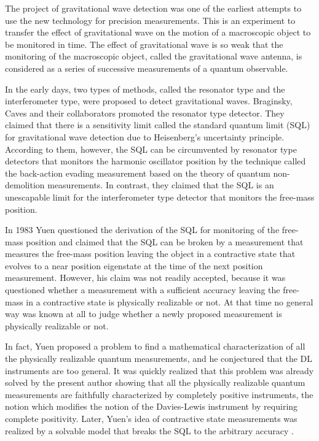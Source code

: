 \documentclass[12pt]{article}
\begin{document}
The project of gravitational wave detection was one of the earliest 
attempts to use the new technology for precision measurements.
This is an experiment to transfer the effect of gravitational wave 
on the motion of a macroscopic object to be monitored in time.
The effect of gravitational wave is so weak that the monitoring of
the macroscopic object, called the gravitational wave antenna, is
considered as a series of successive measurements of 
a quantum observable.

In the early days,  two types of methods, called the resonator type 
and the interferometer type, were proposed to detect gravitational waves.
Braginsky, Caves and their collaborators \cite{BVT80,CTDSZ80} promoted 
the resonator type detector.
They claimed that there is a sensitivity limit called the standard
quantum limit (SQL) for gravitational wave detection due to Heisenberg's
uncertainty principle.  According to them, however, the SQL can be circumvented 
by resonator type detectors that monitors the harmonic oscillator position
by the technique called the back-action evading measurement
based on the theory of quantum non-demolition measurements.
In contrast, they claimed that the SQL is an unescapable limit 
for the interferometer type detector that monitors the free-mass position.

In 1983 Yuen \cite{Yue83} questioned the derivation
of the SQL for monitoring of the free-mass position and claimed
that the SQL can be broken by a measurement 
that measures the free-mass position leaving the object in a
contractive state that evolves to a near position eigenstate 
at the time of the next position measurement.
However, his claim was not readily accepted, because it was questioned 
whether a measurement with a sufficient accuracy
leaving the free-mass in a contractive state is physically realizable or not.
At that time no general way was known at all to judge whether 
a newly proposed measurement is physically realizable or not.

In fact,  Yuen \cite{Yue87} proposed a problem to find a mathematical 
characterization of all the physically realizable quantum measurements,
and he conjectured that the DL instruments are too general.
It was quickly realized that this problem was already solved 
by the present author \cite{84QC} showing that all the physically realizable
quantum measurements are faithfully characterized by completely
positive instruments, the notion which modifies the notion of the
Davies-Lewis instrument by requiring complete positivity.
Later, Yuen's idea of contractive state measurements was realized 
by a solvable model that breaks the SQL to the arbitrary accuracy 
\cite{88MS,89RS,Mad88}.  
\end{document}
